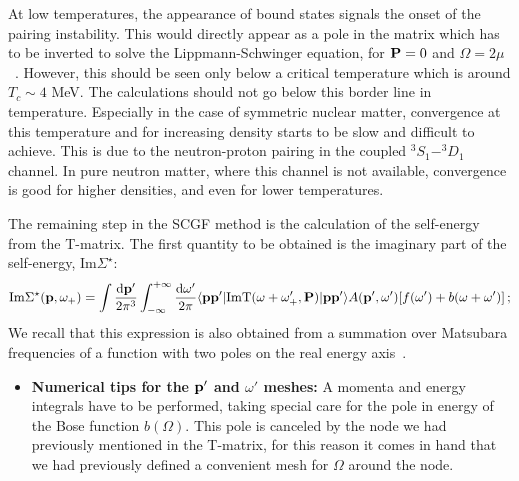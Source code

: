 At low temperatures, the appearance of bound states signals the onset of the pairing instability. This would directly appear as a pole in the matrix which has to be inverted to solve the Lippmann-Schwinger equation, for ${\bf P}=0$ and $\Omega=2\mu$~\cite{ch11_Thouless1960}. However, this should be seen only below a critical temperature which is around $T_c\sim4$ MeV. The calculations should not go below this border line in temperature. Especially in the case of symmetric nuclear matter, convergence at this temperature and for increasing density starts to be slow and difficult to achieve. This is due to the neutron-proton pairing in the coupled $^3S_1-^3D_1$ channel. In pure neutron matter, where this channel is not available, convergence is good for higher densities, and even for lower temperatures. 

 The remaining step in the SCGF method is the calculation of the self-energy from the T-matrix. The first quantity to be obtained is the imaginary part of the self-energy, Im$\Sigma^\star$:
\begin{equation}
{\rm Im}\Sigma^\star({\bf p},\omega_+)=\int\frac{{\rm d}{\bf p'}}{2\pi^3}\int_{-\infty}^{+\infty}\frac{{\rm d}{\omega'}}{2\pi}\langle{\bf pp'}|{\rm Im}{\rm T}(\omega+\omega'_+,{\bf P})|{\bf pp'}\rangle A({\bf p'},\omega')[f(\omega')+b(\omega+\omega')]\,;
\end{equation}
We recall that this expression is also obtained from a summation over Matsubara frequencies of a function with two poles on the real energy axis~\cite{ch11_Rios2007PhD}. 
\begin{itemize}
\item {\bf Numerical tips for the ${\bf p'}$  and $\omega'$ meshes:} A momenta and energy integrals have to be performed, taking special care for the pole in energy of the Bose function $b(\Omega)$. This pole is canceled by the node we had previously mentioned in the T-matrix, for this reason it comes in hand that we had previously defined a convenient mesh for $\Omega$ around the node. 
\end{itemize}
 
